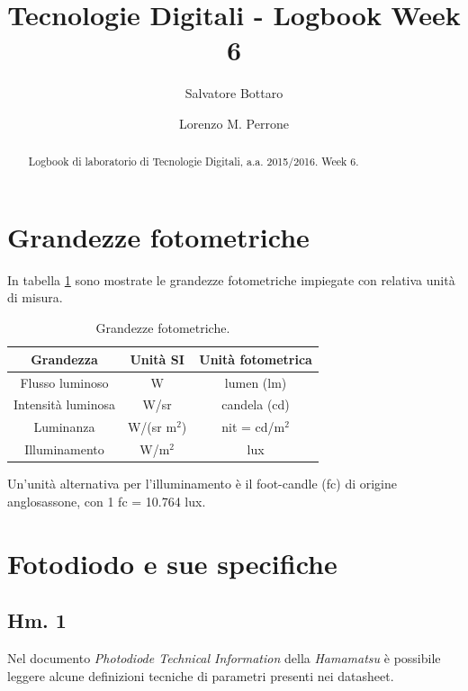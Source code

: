 \documentclass[journal, a4paper]{IEEEtran}
\begin{document}
	\title{Tecnologie Digitali - Logbook Week 6}
	\author[1]{Salvatore Bottaro}
		\author[2]{Lorenzo M. Perrone}
	\maketitle
	
\begin{abstract}
	Logbook di laboratorio di Tecnologie Digitali, a.a. 2015/2016. Week 6.
\end{abstract}

\section{Grandezze fotometriche}

In tabella \ref{tab:foto} sono mostrate le grandezze fotometriche impiegate con relativa unità di misura.

\begin{table}[htp]
\centering
\caption{Grandezze fotometriche.}
\label{tab:foto}
\begin{tabular}{|c|c|c|}
\hline 
Grandezza & Unità SI & Unità fotometrica \\ 
\hline 
Flusso luminoso & W & lumen (lm) \\ 
\hline 
Intensità luminosa & W/sr & candela (cd) \\ 
\hline 
Luminanza & W/(sr m$^2$) & nit = cd/m$^2$ \\ 
\hline 
Illuminamento & W/m$^2$ & lux \\ 
\hline 
\end{tabular} 
\end{table}

Un'unità alternativa per l'illuminamento è il foot-candle (fc) di origine anglosassone, con 1 fc = 10.764 lux.

\section{Fotodiodo e sue specifiche}

\subsection{Hm. 1}

Nel documento \textit{Photodiode Technical Information} della \textit{Hamamatsu} è possibile leggere alcune definizioni tecniche di parametri presenti nei datasheet. 
\end{document}
